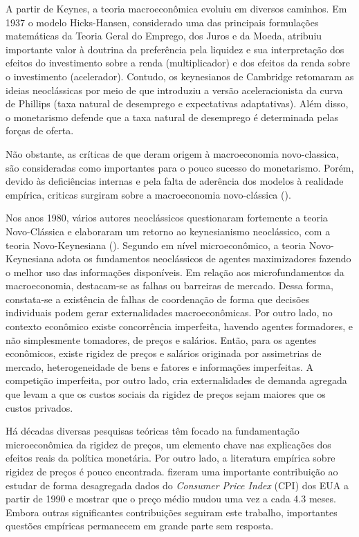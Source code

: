 \documentclass[twoside,a4paper,11pt]{report}
\begin{document}
A partir de Keynes, a teoria macroeconômica evoluiu em diversos caminhos. Em 1937 o modelo Hicks-Hansen, considerado uma das principais formulações matemáticas da Teoria Geral do Emprego, dos Juros e da Moeda, atribuiu importante valor à doutrina da preferência pela liquidez e sua interpretação dos efeitos do investimento sobre a renda (multiplicador) e dos efeitos da renda sobre o investimento (acelerador). Contudo, os keynesianos de Cambridge retomaram as ideias neoclássicas por meio de \citet{friedman1992money}que introduziu a versão aceleracionista da curva de Phillips (taxa natural de desemprego e expectativas adaptativas). Além disso, o monetarismo defende que a taxa natural de desemprego é determinada pelas forças de oferta. 

Não obstante, as críticas de \citet{lucas1972expectations} que deram origem à macroeconomia novo-classica, são consideradas como importantes para o pouco sucesso do monetarismo.  Porém, devido às deficiências internas e pela falta de aderência dos modelos à realidade empírica, criticas surgiram sobre a macroeconomia novo-clássica (\citet{mccallum1998stickiness}).

Nos anos 1980, vários autores neoclássicos  questionaram fortemente a teoria Novo-Clássica e elaboraram um retorno ao keynesianismo neoclássico, com a teoria Novo-Keynesiana (\citet{blinder1983money}). Segundo \citet{datheinintroduccao} em nível microeconômico, a teoria Novo-Keynesiana adota os fundamentos neoclássicos de agentes maximizadores fazendo o melhor uso das informações disponíveis. Em relação aos microfundamentos da macroeconomia, destacam-se as falhas ou barreiras de mercado. Dessa forma, constata-se a existência de falhas de coordenação de forma que decisões individuais podem gerar externalidades macroeconômicas. Por outro lado, no contexto econômico existe concorrência imperfeita, havendo agentes formadores, e não simplesmente tomadores, de preços e salários. Então, para os agentes econômicos, existe rigidez de preços e salários originada por assimetrias de mercado, heterogeneidade de bens e fatores e informações imperfeitas. A competição imperfeita, por outro lado, cria externalidades de demanda agregada que levam a que os custos sociais da rigidez de preços sejam maiores que os custos privados. 

Há décadas diversas pesquisas teóricas têm focado na fundamentação microeconômica da rigidez de preços, um elemento chave nas explicações dos efeitos reais da política monetária. Por outro lado, a literatura empírica sobre rigidez de preços é pouco encontrada. \citet{bils2004some} fizeram uma importante contribuição ao estudar de forma desagregada dados do \emph{Consumer Price Index} (CPI) dos EUA a partir de 1990 e mostrar que o preço médio mudou uma vez a cada 4.3 meses. Embora outras significantes contribuições seguiram este trabalho, importantes questões empíricas permanecem em grande parte sem resposta.
\end{document}
